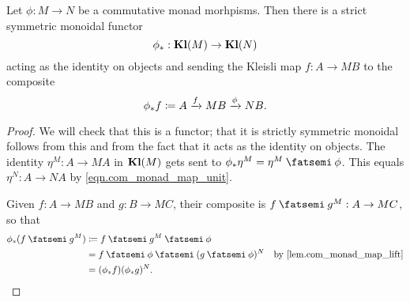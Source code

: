 \documentclass[DynamicalBook]{subfiles}
\begin{document}
\begin{proposition}
  Let $\phi : M \to N$ be a commutative monad morhpisms. Then there is a
  strict symmetric monoidal functor
  $$\phi_{\ast} : \textbf{Kl}(M) \to \textbf{Kl}(N)$$
  acting as the identity on objects and sending the Kleisli map $f : A \to MB$
  to the composite \[\phi_{\ast}f \coloneqq A \xrightarrow{f} M B \xrightarrow{\phi} N B.\]
\end{proposition}
\begin{proof}
  We will check that this is a functor; that it is strictly symmetric monoidal
  follows from this and from the fact that it acts as the identity on objects. 
  The identity $\eta^M : A \to M A$ in $\textbf{Kl}(M)$ gets sent to
  $\phi_{\ast}\eta^M = \eta^M \then \phi$. This equals $\eta^N : A \to NA$ by \cref{eqn.com_monad_map_unit}.

  Given $f : A \to MB$ and $g : B \to MC$, their composite is $f \then g^M : A
  \to M C$, so that
  \begin{align*}
    \phi_{\ast}(f \then g^M) &\coloneqq f \then g^M \then \phi \\
                             &= f \then \phi \then (g \then \phi)^N &\mbox{by \cref{lem.com_monad_map_lift}}\\
    &= (\phi_{\ast} f)(\phi_{\ast} g)^N.
  \end{align*} 
\end{proof}
\end{document}
